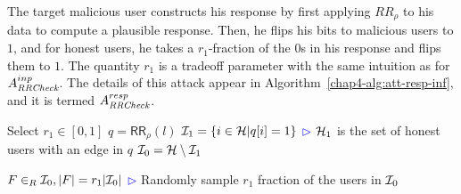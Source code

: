 The target malicious user constructs his response by first applying $RR_\rho$ to his data to compute a plausible response. Then, he flips his bits to malicious users to $1$, and for honest users, he takes a $r_1$-fraction of the $0$s in his response and flips them to $1$. The quantity $r_1$ is a tradeoff parameter with the same intuition as for $A_{\textit{RRCheck}}^{inp}$. The details of this attack appear in Algorithm~\ref{chap4-alg:att-resp-inf}, and it is termed $A_{\textit{RRCheck}}^{resp}$.

%  
%  
%

\begin{algorithm}[bt]
	Select $r_1\in [0,1]$\;
	$q = \textsf{RR}_\rho (l)$\;
	$\mathcal{I}_1=\{i \in \mathcal{H}| q[i]=1\}$\;
  \hfill\textcolor{blue}{$\rhd$} $\mathcal{H}_1$ is the set of honest users with an edge in $q$\;
  $\mathcal{I}_0 = \mathcal{H} \setminus \mathcal{I}_1$\;

  $F\in_R \mathcal{I}_0, |F|=r_1|\mathcal{I}_0|$\;
  \hfill\textcolor{blue}{$\rhd$} Randomly sample $r_1$ fraction of the users in $\mathcal{I}_0$\;
  \caption{$A_{\DegRRCheck}^{resp}: \{0,1\}^n\mapsto\{0,1\}^n$ }\label{chap4-alg:att-resp-inf}
\end{algorithm}

